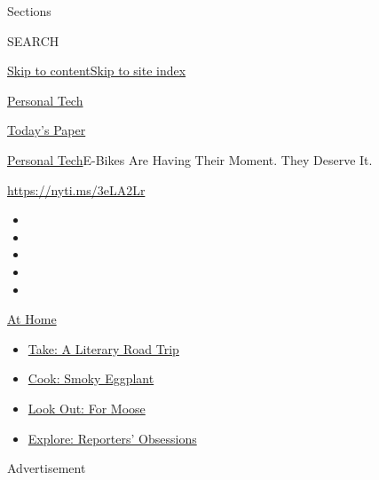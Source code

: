 Sections

SEARCH

\protect\hyperlink{site-content}{Skip to
content}\protect\hyperlink{site-index}{Skip to site index}

\href{https://www.nytimes.com/section/technology/personaltech}{Personal
Tech}

\href{https://myaccount.nytimes.com/auth/login?response_type=cookie\&client_id=vi}{}

\href{https://www.nytimes.com/section/todayspaper}{Today's Paper}

\href{/section/technology/personaltech}{Personal Tech}\textbar{}E-Bikes
Are Having Their Moment. They Deserve It.

\url{https://nyti.ms/3eLA2Lr}

\begin{itemize}
\item
\item
\item
\item
\item
\end{itemize}

\href{https://www.nytimes.com/spotlight/at-home?action=click\&pgtype=Article\&state=default\&region=TOP_BANNER\&context=at_home_menu}{At
Home}

\begin{itemize}
\tightlist
\item
  \href{https://www.nytimes.com/2020/07/28/books/time-for-a-literary-road-trip.html?action=click\&pgtype=Article\&state=default\&region=TOP_BANNER\&context=at_home_menu}{Take:
  A Literary Road Trip}
\item
  \href{https://www.nytimes.com/2020/07/29/magazine/bored-with-your-home-cooking-some-smoky-eggplant-will-fix-that.html?action=click\&pgtype=Article\&state=default\&region=TOP_BANNER\&context=at_home_menu}{Cook:
  Smoky Eggplant}
\item
  \href{https://www.nytimes.com/2020/07/27/travel/moose-michigan-isle-royale.html?action=click\&pgtype=Article\&state=default\&region=TOP_BANNER\&context=at_home_menu}{Look
  Out: For Moose}
\item
  \href{https://www.nytimes.com/interactive/2020/at-home/even-more-reporters-editors-diaries-lists-recommendations.html?action=click\&pgtype=Article\&state=default\&region=TOP_BANNER\&context=at_home_menu}{Explore:
  Reporters' Obsessions}
\end{itemize}

Advertisement

